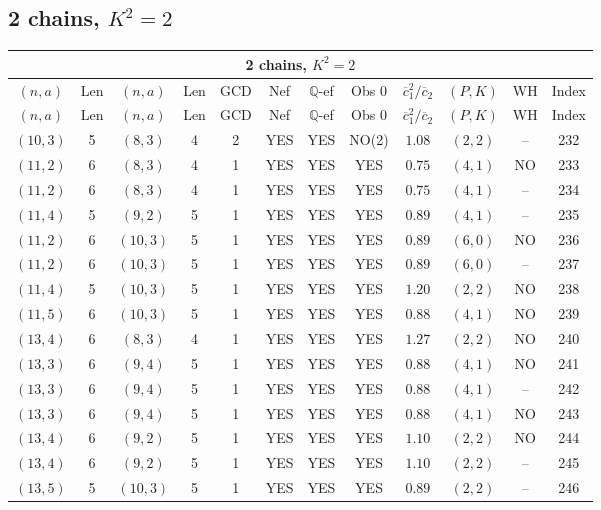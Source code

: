 \subsection{2 chains, $K^2 = 2$}
\begin{longtable}{|c|c|c|c|c|c|c|c|c|c|c|c|}
\hline
\multicolumn{12}{|c|}{2 chains, $K^2 = 2$}\\
\hline
$(n,a)$ & Len & $(n,a)$ & Len & GCD & Nef & $\mathbb Q$-ef & Obs 0 & $\overline c_1^2 / \overline c_2$ & $(P,K)$ & WH & Index\\
\hline
\endfirsthead

\hline
$(n,a)$ & Len & $(n,a)$ & Len & GCD & Nef & $\mathbb Q$-ef & Obs 0 & $\overline c_1^2 / \overline c_2$ & $(P,K)$ & WH & Index\\
\hline
\endhead
\hline
\endfoot

$(10,3)$ & 5 & $(8,3)$ & 4 & 2 & YES & YES & NO(2) & $1.08$ & $(2,2)$ & -- & 232\\
$(11,2)$ & 6 & $(8,3)$ & 4 & 1 & YES & YES & YES & $0.75$ & $(4,1)$ & NO & 233\\
$(11,2)$ & 6 & $(8,3)$ & 4 & 1 & YES & YES & YES & $0.75$ & $(4,1)$ & -- & 234\\
$(11,4)$ & 5 & $(9,2)$ & 5 & 1 & YES & YES & YES & $0.89$ & $(4,1)$ & -- & 235\\
$(11,2)$ & 6 & $(10,3)$ & 5 & 1 & YES & YES & YES & $0.89$ & $(6,0)$ & NO & 236\\
$(11,2)$ & 6 & $(10,3)$ & 5 & 1 & YES & YES & YES & $0.89$ & $(6,0)$ & -- & 237\\
$(11,4)$ & 5 & $(10,3)$ & 5 & 1 & YES & YES & YES & $1.20$ & $(2,2)$ & NO & 238\\
$(11,5)$ & 6 & $(10,3)$ & 5 & 1 & YES & YES & YES & $0.88$ & $(4,1)$ & NO & 239\\
$(13,4)$ & 6 & $(8,3)$ & 4 & 1 & YES & YES & YES & $1.27$ & $(2,2)$ & NO & 240\\
$(13,3)$ & 6 & $(9,4)$ & 5 & 1 & YES & YES & YES & $0.88$ & $(4,1)$ & NO & 241\\
$(13,3)$ & 6 & $(9,4)$ & 5 & 1 & YES & YES & YES & $0.88$ & $(4,1)$ & -- & 242\\
$(13,3)$ & 6 & $(9,4)$ & 5 & 1 & YES & YES & YES & $0.88$ & $(4,1)$ & NO & 243\\
$(13,4)$ & 6 & $(9,2)$ & 5 & 1 & YES & YES & YES & $1.10$ & $(2,2)$ & NO & 244\\
$(13,4)$ & 6 & $(9,2)$ & 5 & 1 & YES & YES & YES & $1.10$ & $(2,2)$ & -- & 245\\
$(13,5)$ & 5 & $(10,3)$ & 5 & 1 & YES & YES & YES & $0.89$ & $(2,2)$ & -- & 246\\

\end{longtable}
